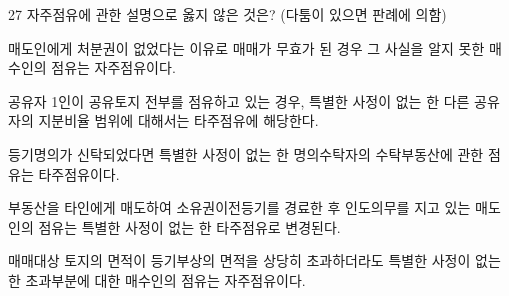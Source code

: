 \begin{question}{27}
자주점유에 관한 설명으로 옳지 않은 것은? (다툼이 있으면 판례에 의함)
\begin{choices}
  \item 매도인에게 처분권이 없었다는 이유로 매매가 무효가 된 경우 그 사실을 알지 못한 매수인의 점유는 자주점유이다.
  \item 공유자 1인이 공유토지 전부를 점유하고 있는 경우, 특별한 사정이 없는 한 다른 공유자의 지분비율 범위에 대해서는 타주점유에 해당한다.
  \item 등기명의가 신탁되었다면 특별한 사정이 없는 한 명의수탁자의 수탁부동산에 관한 점유는 타주점유이다.
  \item 부동산을 타인에게 매도하여 소유권이전등기를 경료한 후 인도의무를 지고 있는 매도인의 점유는 특별한 사정이 없는 한 타주점유로 변경된다.
  \item 매매대상 토지의 면적이 등기부상의 면적을 상당히 초과하더라도 특별한 사정이 없는 한 초과부분에 대한 매수인의 점유는 자주점유이다.
\end{choices}
\end{question}
